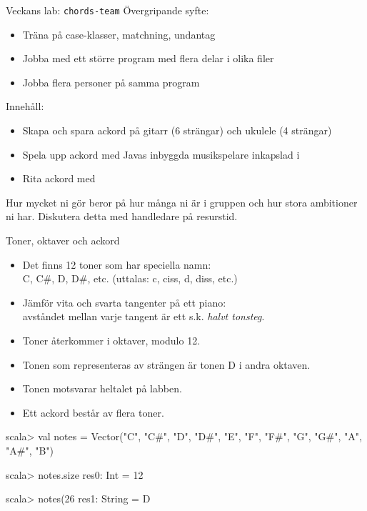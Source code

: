 \begin{Slide}{Veckans lab: \texttt{chords-team}}\SlideFontSmall
Övergripande syfte:
\begin{itemize}
\item Träna på case-klasser, matchning, undantag
\item Jobba med ett större program med flera delar i olika filer
\item Jobba flera personer på samma program
\end{itemize}
Innehåll:
\begin{itemize}
\item Skapa och spara ackord på gitarr (6 strängar) och ukulele (4 strängar) 
\item Spela upp ackord med Javas inbyggda musikspelare inkapslad i 
\item Rita ackord med  
\end{itemize}
Hur mycket ni gör beror på hur många ni är i gruppen och hur stora ambitioner ni har. Diskutera detta med handledare på resurstid.
\end{Slide}

\begin{Slide}{Toner, oktaver och ackord}\SlideFontSmall
\begin{itemize}
\item Det finns 12 toner som har speciella namn: \\ C, C\#, D, D\#, etc. (uttalas: c, ciss, d, diss, etc.)
\item Jämför vita och svarta tangenter på ett piano: \\ avståndet mellan varje tangent är ett s.k. \emph{halvt tonsteg}. 
\item Toner återkommer i oktaver, modulo 12.
\item Tonen som representeras av strängen  är tonen D i andra oktaven.
\item Tonen  motsvarar heltalet  på labben.
\item Ett ackord består av flera toner.
\end{itemize}
\begin{REPL}[basicstyle=\color{white}\ttfamily\SlideFontSize{6}{7}\selectfont]
scala> val notes = Vector("C", "C#", "D", "D#", "E", "F", "F#", "G", "G#", "A", "A#", "B")

scala> notes.size
res0: Int = 12

scala> notes(26 %
res1: String = D

\end{REPL}
\end{Slide}

